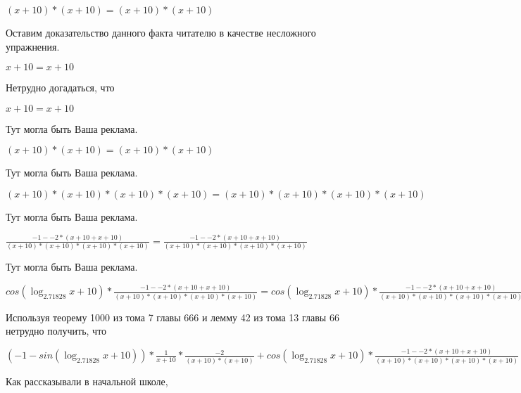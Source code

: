 \documentclass[12pt,a4paper,fleqn]{article}
\theoremstyle{definition}
\begin{document}
$( x  +  10 ) * ( x  +  10 ) = ( x  +  10 ) * ( x  +  10 )$

Оставим доказательство данного факта читателю в качестве несложного упражнения. 

$ x  +  10  =  x  +  10 $

Нетрудно догадаться, что 

$ x  +  10  =  x  +  10 $

Тут могла быть Ваша реклама. 

$( x  +  10 ) * ( x  +  10 ) = ( x  +  10 ) * ( x  +  10 )$

Тут могла быть Ваша реклама. 

$( x  +  10 ) * ( x  +  10 ) * ( x  +  10 ) * ( x  +  10 ) = ( x  +  10 ) * ( x  +  10 ) * ( x  +  10 ) * ( x  +  10 )$

Тут могла быть Ваша реклама. 

$\frac{ -1  -  -2  * ( x  +  10  +  x  +  10 )}{( x  +  10 ) * ( x  +  10 ) * ( x  +  10 ) * ( x  +  10 )}
 = \frac{ -1  -  -2  * ( x  +  10  +  x  +  10 )}{( x  +  10 ) * ( x  +  10 ) * ( x  +  10 ) * ( x  +  10 )}
$

Тут могла быть Ваша реклама. 

$cos(\log_{ 2.71828 }{ x  +  10 }) * \frac{ -1  -  -2  * ( x  +  10  +  x  +  10 )}{( x  +  10 ) * ( x  +  10 ) * ( x  +  10 ) * ( x  +  10 )}
 = cos(\log_{ 2.71828 }{ x  +  10 }) * \frac{ -1  -  -2  * ( x  +  10  +  x  +  10 )}{( x  +  10 ) * ( x  +  10 ) * ( x  +  10 ) * ( x  +  10 )}
$

Используя теорему 1000 из тома 7 главы 666 и лемму 42 из тома 13 главы 66 нетрудно получить, что 

$( -1  - sin(\log_{ 2.71828 }{ x  +  10 })) * \frac{ 1 }{ x  +  10 }
 * \frac{ -2 }{( x  +  10 ) * ( x  +  10 )}
 + cos(\log_{ 2.71828 }{ x  +  10 }) * \frac{ -1  -  -2  * ( x  +  10  +  x  +  10 )}{( x  +  10 ) * ( x  +  10 ) * ( x  +  10 ) * ( x  +  10 )}
 = ( -1  - sin(\log_{ 2.71828 }{ x  +  10 })) * \frac{ 1 }{ x  +  10 }
 * \frac{ -2 }{( x  +  10 ) * ( x  +  10 )}
 + cos(\log_{ 2.71828 }{ x  +  10 }) * \frac{ -1  -  -2  * ( x  +  10  +  x  +  10 )}{( x  +  10 ) * ( x  +  10 ) * ( x  +  10 ) * ( x  +  10 )}
$

Как рассказывали в начальной школе, 
\end{document}
